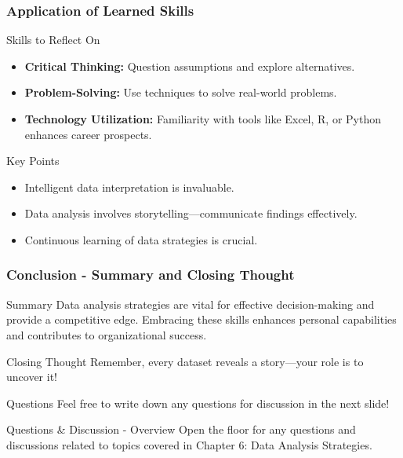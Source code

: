 \documentclass[aspectratio=169]{beamer}
\begin{document}
\begin{frame}[fragile]
    \frametitle{Application of Learned Skills}
    \begin{block}{Skills to Reflect On}
        \begin{itemize}
            \item \textbf{Critical Thinking:} Question assumptions and explore alternatives.
            \item \textbf{Problem-Solving:} Use techniques to solve real-world problems.
            \item \textbf{Technology Utilization:} Familiarity with tools like Excel, R, or Python enhances career prospects.
        \end{itemize}
    \end{block}
    
    \begin{block}{Key Points}
        \begin{itemize}
            \item Intelligent data interpretation is invaluable.
            \item Data analysis involves storytelling—communicate findings effectively.
            \item Continuous learning of data strategies is crucial.
        \end{itemize}
    \end{block}
\end{frame}

\begin{frame}[fragile]
    \frametitle{Conclusion - Summary and Closing Thought}
    \begin{block}{Summary}
        Data analysis strategies are vital for effective decision-making and provide a competitive edge.
        Embracing these skills enhances personal capabilities and contributes to organizational success.
    \end{block}
    
    \begin{block}{Closing Thought}
        Remember, every dataset reveals a story—your role is to uncover it!
    \end{block}
    
    \begin{block}{Questions}
        Feel free to write down any questions for discussion in the next slide!
    \end{block}
\end{frame}

\begin{frame}[fragile]{Questions \& Discussion - Overview}
    Open the floor for any questions and discussions related to topics covered in Chapter 6: Data Analysis Strategies.
\end{frame}
\end{document}
